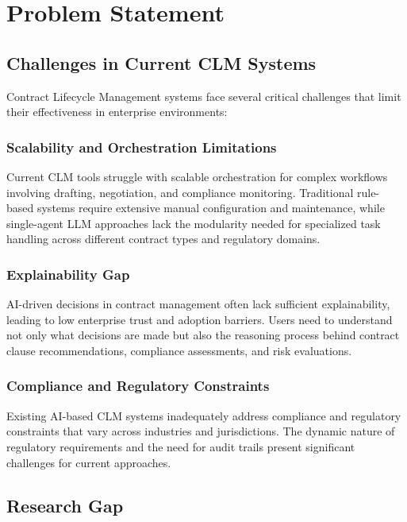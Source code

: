 
\chapter{Problem Statement}\label{chapter:problem_statement}

\section{Challenges in Current CLM Systems}

Contract Lifecycle Management systems face several critical challenges that limit their effectiveness in enterprise environments:

\subsection{Scalability and Orchestration Limitations}
Current CLM tools struggle with scalable orchestration for complex workflows involving drafting, negotiation, and compliance monitoring. Traditional rule-based systems require extensive manual configuration and maintenance, while single-agent LLM approaches lack the modularity needed for specialized task handling across different contract types and regulatory domains.

\subsection{Explainability Gap}
AI-driven decisions in contract management often lack sufficient explainability, leading to low enterprise trust and adoption barriers. Users need to understand not only what decisions are made but also the reasoning process behind contract clause recommendations, compliance assessments, and risk evaluations.

\subsection{Compliance and Regulatory Constraints}
Existing AI-based CLM systems inadequately address compliance and regulatory constraints that vary across industries and jurisdictions. The dynamic nature of regulatory requirements and the need for audit trails present significant challenges for current approaches.

\section{Research Gap}

